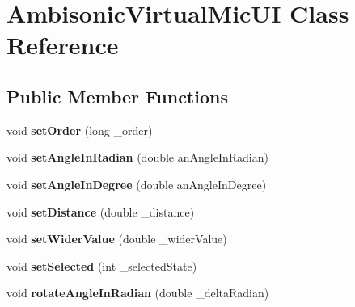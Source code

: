 \hypertarget{class_ambisonic_virtual_mic_u_i}{\section{Ambisonic\-Virtual\-Mic\-U\-I Class Reference}
\label{class_ambisonic_virtual_mic_u_i}
}
\subsection*{Public Member Functions}
\begin{DoxyCompactItemize}
\item 
\hypertarget{class_ambisonic_virtual_mic_u_i_abb3bca20b6edfecb75ce9910859aae61}{void {\bfseries set\-Order} (long \-\_\-order)}\label{class_ambisonic_virtual_mic_u_i_abb3bca20b6edfecb75ce9910859aae61}

\item 
\hypertarget{class_ambisonic_virtual_mic_u_i_abbd9e92b5e7ea4426daae223879c62e6}{void {\bfseries set\-Angle\-In\-Radian} (double an\-Angle\-In\-Radian)}\label{class_ambisonic_virtual_mic_u_i_abbd9e92b5e7ea4426daae223879c62e6}

\item 
\hypertarget{class_ambisonic_virtual_mic_u_i_aa118984ac0b2e7fed8a0446090b306fb}{void {\bfseries set\-Angle\-In\-Degree} (double an\-Angle\-In\-Degree)}\label{class_ambisonic_virtual_mic_u_i_aa118984ac0b2e7fed8a0446090b306fb}

\item 
\hypertarget{class_ambisonic_virtual_mic_u_i_a57861fa593dcce5d3313f7698798e826}{void {\bfseries set\-Distance} (double \-\_\-distance)}\label{class_ambisonic_virtual_mic_u_i_a57861fa593dcce5d3313f7698798e826}

\item 
\hypertarget{class_ambisonic_virtual_mic_u_i_af17d75effc46a7f8955b4fb56a95b693}{void {\bfseries set\-Wider\-Value} (double \-\_\-wider\-Value)}\label{class_ambisonic_virtual_mic_u_i_af17d75effc46a7f8955b4fb56a95b693}

\item 
\hypertarget{class_ambisonic_virtual_mic_u_i_a2c8ef3df932235abb265b41484980e6e}{void {\bfseries set\-Selected} (int \-\_\-selected\-State)}\label{class_ambisonic_virtual_mic_u_i_a2c8ef3df932235abb265b41484980e6e}

\item 
\hypertarget{class_ambisonic_virtual_mic_u_i_a7c7ae504eaee4e9e8ffd7d8b01a06400}{void {\bfseries rotate\-Angle\-In\-Radian} (double \-\_\-delta\-Radian)}\label{class_ambisonic_virtual_mic_u_i_a7c7ae504eaee4e9e8ffd7d8b01a06400}


\end{DoxyCompactItemize}
